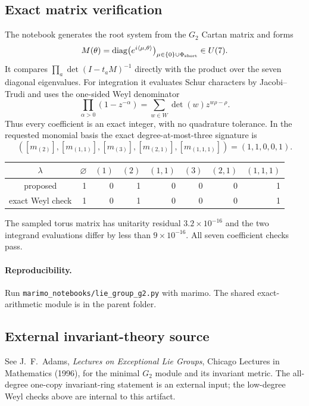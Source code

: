 \documentclass[10pt]{article}
\begin{document}
\subsection{Exact matrix verification}
The notebook generates the root system from the $G_2$ Cartan matrix and forms
\[
 M(\theta)=\operatorname{diag}\bigl(e^{i\langle\mu,\theta\rangle}\bigr)_{
 \mu\in\{0\}\cup\Phi_{\rm short}}\in U(7).
\]
It compares $\prod_a\det(I-t_aM)^{-1}$ directly with the product over the
seven diagonal eigenvalues.  For integration it evaluates Schur characters by
Jacobi--Trudi and uses the one-sided Weyl denominator
\[
 \prod_{\alpha>0}(1-z^{-\alpha})
 =\sum_{w\in W}\det(w)z^{w\rho-\rho}.
\]
Thus every coefficient is an exact integer, with no quadrature tolerance.
In the requested monomial basis the exact degree-at-most-three signature is
\[
([m_{(2)}],[m_{(1,1)}],[m_{(3)}],[m_{(2,1)}],[m_{(1,1,1)}])
=(1,1,0,0,1).
\]

\begin{center}\small
\begin{tabular}{@{}c|rrrrrrr@{}}\toprule
$\lambda$&$\varnothing$&$(1)$&$(2)$&$(1,1)$&$(3)$&$(2,1)$&$(1,1,1)$\\\midrule
proposed&1&0&1&0&0&0&1\\
exact Weyl check&1&0&1&0&0&0&1\\\bottomrule
\end{tabular}
\end{center}
The sampled torus matrix has unitarity residual $3.2\times10^{-16}$ and the
two integrand evaluations differ by less than $9\times10^{-16}$.  All seven
coefficient checks pass.

\paragraph{Reproducibility.}
Run \texttt{marimo\_notebooks/lie\_group\_g2.py} with marimo.  The shared exact-arithmetic
module is in the parent folder.

\subsection*{External invariant-theory source}
See J.~F.~Adams, \emph{Lectures on Exceptional Lie Groups}, Chicago
Lectures in Mathematics (1996), for the minimal $G_2$ module and its invariant
metric.  The all-degree one-copy invariant-ring statement is an external
input; the low-degree Weyl checks above are internal to this artifact.
\endgroup


\clearpage
\end{document}
